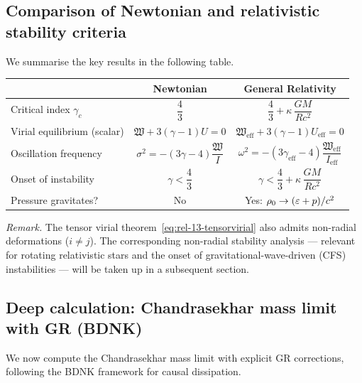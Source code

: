 \subsection{Comparison of Newtonian and relativistic stability criteria}
\label{sec:rel-118-comparison}

We summarise the key results in the following table.

\begin{center}
\renewcommand{\arraystretch}{1.4}
\begin{tabular}{lcc}
\hline\hline
& \textbf{Newtonian} & \textbf{General Relativity} \\
\hline
Critical index $\gamma_{c}$
  & $\dfrac{4}{3}$
  & $\dfrac{4}{3} + \kappa\,\dfrac{GM}{Rc^{2}}$ \\[6pt]
Virial equilibrium (scalar)
  & $\mathfrak{W} + 3(\gamma\!-\!1)U = 0$
  & $\mathfrak{W}_{\mathrm{eff}} + 3(\gamma\!-\!1)U_{\mathrm{eff}} = 0$ \\[4pt]
Oscillation frequency
  & $\sigma^{2} = -(3\gamma\!-\!4)\dfrac{\mathfrak{W}}{I}$
  & $\omega^{2} = -(3\gamma_{\mathrm{eff}}\!-\!4)
    \dfrac{\mathfrak{W}_{\mathrm{eff}}}{I_{\mathrm{eff}}}$ \\[6pt]
Onset of instability
  & $\gamma < \dfrac{4}{3}$
  & $\gamma < \dfrac{4}{3} + \kappa\,\dfrac{GM}{Rc^{2}}$ \\[4pt]
Pressure gravitates?
  & No
  & Yes: $\rho_0 \to (\varepsilon+p)/c^{2}$ \\
\hline\hline
\end{tabular}
\end{center}

\bigskip
\noindent
\textit{Remark.}  The tensor virial
theorem~\eqref{eq:rel-13-tensorvirial} also admits non-radial
deformations ($i\neq j$).  The corresponding non-radial stability
analysis --- relevant for rotating relativistic stars and the onset of
gravitational-wave-driven (CFS) instabilities --- will be taken up in
a subsequent section.

\subsection{Deep calculation: Chandrasekhar mass limit with GR (BDNK)}
\label{sec:rel-118-deep-chandrasekhar}

We now compute the Chandrasekhar mass limit with explicit GR corrections,
following the BDNK framework for causal dissipation.

